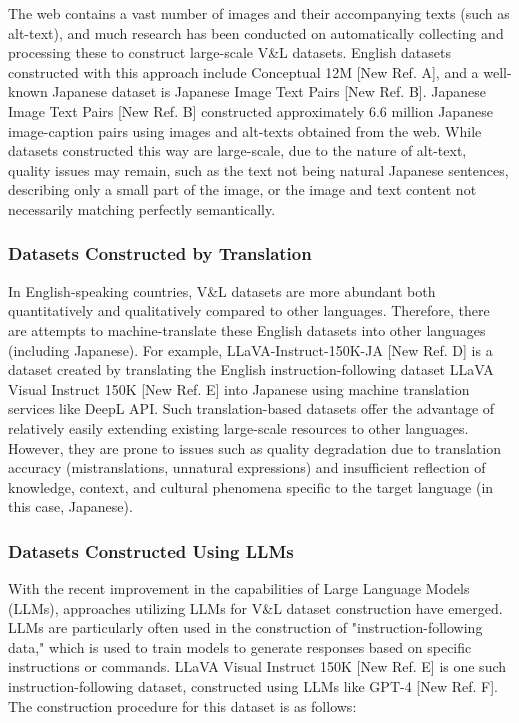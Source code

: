\documentclass[11pt]{article}
\begin{document}
The web contains a vast number of images and their accompanying texts (such as alt-text), and much research has been conducted on automatically collecting and processing these to construct large-scale V\&L datasets. English datasets constructed with this approach include Conceptual 12M [New Ref. A], and a well-known Japanese dataset is Japanese Image Text Pairs [New Ref. B].
Japanese Image Text Pairs [New Ref. B] constructed approximately 6.6 million Japanese image-caption pairs using images and alt-texts obtained from the web.
While datasets constructed this way are large-scale, due to the nature of alt-text, quality issues may remain, such as the text not being natural Japanese sentences, describing only a small part of the image, or the image and text content not necessarily matching perfectly semantically.

\subsubsection{Datasets Constructed by Translation}

In English-speaking countries, V\&L datasets are more abundant both quantitatively and qualitatively compared to other languages. Therefore, there are attempts to machine-translate these English datasets into other languages (including Japanese). For example, LLaVA-Instruct-150K-JA [New Ref. D] is a dataset created by translating the English instruction-following dataset LLaVA Visual Instruct 150K [New Ref. E] into Japanese using machine translation services like DeepL API.
Such translation-based datasets offer the advantage of relatively easily extending existing large-scale resources to other languages. However, they are prone to issues such as quality degradation due to translation accuracy (mistranslations, unnatural expressions) and insufficient reflection of knowledge, context, and cultural phenomena specific to the target language (in this case, Japanese).

\subsubsection{Datasets Constructed Using LLMs}

With the recent improvement in the capabilities of Large Language Models (LLMs), approaches utilizing LLMs for V\&L dataset construction have emerged. LLMs are particularly often used in the construction of "instruction-following data," which is used to train models to generate responses based on specific instructions or commands.
LLaVA Visual Instruct 150K [New Ref. E] is one such instruction-following dataset, constructed using LLMs like GPT-4 [New Ref. F]. The construction procedure for this dataset is as follows:
\end{document}

